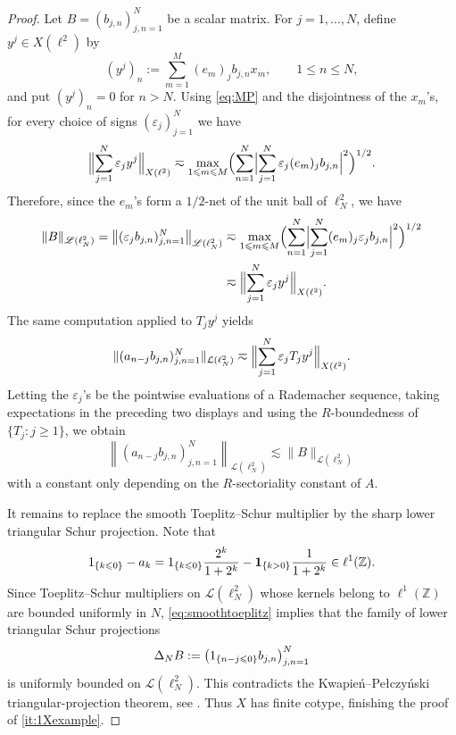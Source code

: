 \documentclass{amsart}
\let\le\leqslant
\let\ge\geqslant
\theoremstyle{plain}
\theoremstyle{remark}
\theoremstyle{plain}
\numberwithin{equation}{section}
\newcommand{\Z}{\mathbb Z}
\newcommand{\1}{\mathbf 1}
\newcommand{\mc}{\mathcal}
\newcommand{\ms}{\mathscr}
\newcommand{\nrmB}[1]{\Bigl\|#1\Bigr\|}
\newcommand{\absB}[1]{\Bigl|#1\Bigr|}
\newcommand{\brB}[1]{\Bigl(#1\Bigr)}
\begin{document}
\begin{proof}
Let $B=(b_{j,n})_{j,n=1}^N$ be a scalar matrix. For $j=1,\ldots,N$, define
$y^j\in X(\ell^2)$ by
\[
        (y^j)_n:=\sum_{m=1}^M (e_m)_j b_{j,n}x_m,    \qquad 1\le n\le N,
\]
and put $(y^j)_n=0$ for $n>N$. Using \eqref{eq:MP} and the disjointness of the $x_m$'s, for every choice of signs
$(\varepsilon_j)_{j=1}^N$ we have
\begin{align*}
 \nrmB{\sum_{j=1}^N \varepsilon_j y^j
        }_{X(\ell^2)} \eqsim\max_{1\le m\le M}\brB{\sum_{n=1}^N\absB{\sum_{j=1}^N \varepsilon_j(e_m)_j b_{j,n}}^2}^{1/2}.
\end{align*}
Therefore, since the $e_m$'s form a $1/2$-net of the unit ball of $\ell^2_N$, we have
\begin{align*}
  \|B\|_{\ms{L}(\ell_N^2)} = \left\|(\varepsilon_j b_{j,n})_{j,n=1}^N\right\|_{\ms L(\ell_N^2)} &\eqsim \max_{1\le m\le M} \brB{\sum_{n=1}^N \absB{\sum_{j=1}^N (e_m)_j \varepsilon_j b_{j,n} }^2}^{1/2} \\&\eqsim \nrmB{\sum_{j=1}^N \varepsilon_j y^j  }_{X(\ell^2)}.
\end{align*}
The same computation applied to $T_jy^j$ yields
\[
\|(a_{n-j}b_{j,n})_{j,n=1}^N\|_{\mc{L}(\ell_N^2)} \eqsim  \nrmB{\sum_{j=1}^N \varepsilon_j T_j y^j}_{X(\ell^2)}.
\]
Letting the $\varepsilon_j$'s be the pointwise evaluations of a Rademacher sequence, taking expectations in the preceding two displays and using the $R$-boundedness of $\{T_j:j\ge1\}$, we obtain
\begin{equation}\label{eq:smoothtoeplitz}
  \left\| (a_{n-j}b_{j,n})_{j,n=1}^N \right\|_{\mathscr L(\ell_N^2)}  \lesssim\|B\|_{\mathscr L(\ell_N^2)}
\end{equation}
with a constant only depending on the $R$-sectoriality constant of $A$.

It remains to replace the smooth Toeplitz--Schur multiplier by the sharp lower triangular Schur projection. Note that
\[
        \mathbf \1_{\{k\le0\}}-a_k =   \mathbf \1_{\{k\le0\}}\frac{2^k}{1+2^k} - \1_{\{k>0\}}\frac{1}{1+2^k}   \in\ell^1(\mathbb Z).
\]
Since Toeplitz--Schur multipliers on $\mc L(\ell_N^2)$ whose kernels belong to $\ell^1(\Z)$ are bounded uniformly in $N$, \eqref{eq:smoothtoeplitz} implies that the family of lower triangular Schur projections
\[
        \Delta_NB := \bigl(\mathbf \1_{\{n-j\le 0\}}b_{j,n}\bigr)_{j,n=1}^N
\]
is uniformly bounded on $\mathscr L(\ell_N^2)$. This contradicts the Kwapie\'n--Pe{\l}czy\'nski triangular-projection theorem, see \cite[Lemma 7.5.12]{HNVW2}. Thus $X$ has finite cotype, finishing the proof of \ref{it:1Xexample}.
\smallskip


\end{proof}
\end{document}
